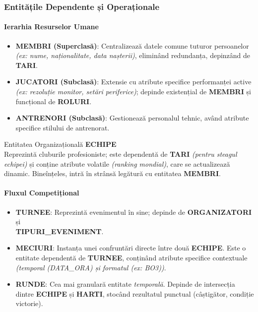 \documentclass[11pt, a4paper]{article}
\begin{document}
\subsubsection{Entitățile Dependente și Operaționale}

\paragraph{Ierarhia Resurselor Umane}
\begin{itemize}
    \item \textbf{MEMBRI (Superclasă)}: Centralizează datele comune tuturor persoanelor \textit{(ex: nume, naționalitate, data nașterii)}, eliminând redundanța, depinzând de \textbf{TARI}.
    \item \textbf{JUCATORI (Subclasă)}: Extensie cu atribute specifice performanței active \textit{(ex: rezoluție monitor, setări periferice)}; depinde existențial de \textbf{MEMBRI} și funcțional de \textbf{ROLURI}.
    \item \textbf{ANTRENORI (Subclasă)}: Gestionează personalul tehnic, având atribute specifice stilului de antrenorat.
\end{itemize}

Entitatea Organizațională \textbf{ECHIPE} \\
Reprezintă cluburile profesioniste; este dependentă de \textbf{TARI} \textit{(pentru steagul echipei)} și conține atribute volatile \textit{(ranking mondial)}, care se actualizează dinamic. Bineînțeles, intră în strânsă legătură cu entitatea \textbf{MEMBRI}.

\paragraph{Fluxul Competițional}
\begin{itemize}
    \item \textbf{TURNEE}: Reprezintă evenimentul în sine; depinde de \textbf{ORGANIZATORI} și \\ \textbf{TIPURI\_EVENIMENT}.
    \item \textbf{MECIURI}: Instanța unei confruntări directe între două \textbf{ECHIPE}. Este o entitate dependentă de \textbf{TURNEE}, conținând atribute specifice contextuale \textit{(temporal (DATA\_ORA) și formatul (ex: BO3))}.
    \item \textbf{RUNDE}: Cea mai granulară entitate \textit{temporală}. Depinde de intersecția dintre \textbf{ECHIPE} și \textbf{HARTI}, stocând rezultatul punctual (câștigător, condiție victorie).
\end{itemize}
\end{document}
